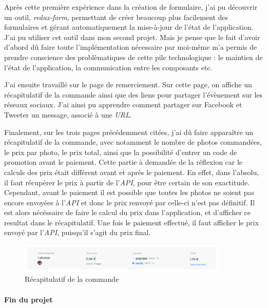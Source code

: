 Après cette première expérience dans la création de formulaire, j'ai pu
découvrir un outil, \emph{redux-form}, permettant de créer beaucoup plus
facilement des formulaires et gérant automatiquement la mise-à-jour de
l'état de l'application. J'ai pu utiliser cet outil dans mon second
projet. Mais je pense que le fait d'avoir d'abord dû faire toute
l'implémentation nécessaire par moi-même m'a permis de prendre
conscience des problèmatiques de cette pile technologique : le maintien
de l'état de l'application, la communication entre les composants etc.

\bigskip

J'ai ensuite travaillé sur le page de remerciement. Sur cette page, on
affiche un récapitulatif de la commande ainsi que des liens pour
partager l'évènement sur les réseaux sociaux. J'ai ainsi pu apprendre
comment partager sur Facebook et Tweeter un message, associé à une
\emph{URL}.

\bigskip

Finalement, sur les trois pages précédemment citées, j'ai dû faire
apparaître un récapitulatif de la commande, avec notamment le nombre de
photos commandées, le prix par photo, le prix total, ainsi que la
possibilité d'entrer un code de promotion avant le paiement. Cette
partie à demandée de la réflexion car le calculs des prix était
différent avant et après le paiement. En effet, dans l'absolu, il faut
récupérer le prix à partir de l'\emph{API}, pour être certain de son
exactitude. Cependant, avant le paiement il est possible que toutes les
photos ne soient pas encore envoyées à l'\emph{API} et donc le prix
renvoyé par celle-ci n'est pas définitif. Il est alors nécéssaire de
faire le calcul du prix dans l'application, et d'afficher ce resultat
dans le récapitulatif. Une fois le paiement effectué, il faut afficher
le prix envoyé par l'\emph{API}, puisqu'il s'agit du prix final.

\begin{figure}[h]
  \centering
  \includegraphics[width=10cm]{figures/photolix-2.png}
  \caption{Récapitulatif de la commande}
\end{figure}

\bigskip

\paragraph{Fin du projet}\label{fin-du-projet}

